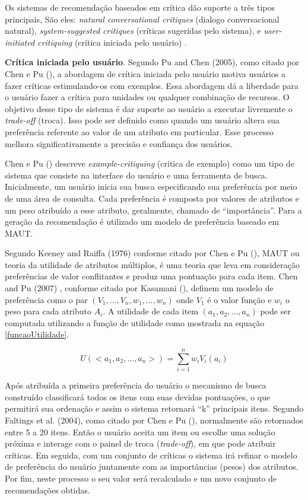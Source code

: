 Os sistemas de recomendação baseados em crítica dão suporte a três tipos principais, São eles: \textit{natural conversational critiques} (dialogo conversacional natural), \textit{system-suggested critiques} (críticas sugeridas pelo sistema), e \textit{user-initiated critiquing} (crítica iniciada pelo usuário) \cite{Chen:2012}.

\textbf{Crítica iniciada pelo usuário}. Segundo Pu and Chen (2005), como citado por Chen e Pu (\citeyear{Chen:2012}), a abordagem de crítica iniciada pelo usuário motiva usuários a fazer críticas estimulando-os com exemplos. Essa abordagem dá a liberdade para o usuário fazer a crítica para unidades ou qualquer combinação de recursos. O objetivo desse tipo de sistema é dar suporte ao usuário a executar livremente o \textit{trade-off} (troca). Isso pode ser definido como quando um usuário altera sua preferência referente ao valor de um atributo em particular. Esse processo melhora significativamente a precisão e confiança dos usuários.

Chen e Pu (\citeyear{Chen:2012}) descreve \textit{example-critiquing} (crítica de exemplo) como um tipo de sistema que consiste na interface do usuário e uma ferramenta de busca. Inicialmente, um usuário inicia sua busca especificando sua preferência por meio de uma área de consulta. Cada preferência é composta por valores de atributos e um peso atribuído a esse atributo, geralmente, chamado de “importância”. Para a geração da recomendação é utilizado um modelo de preferência baseado em MAUT.

Segundo Keeney and Raiffa (1976) conforme citado por Chen e Pu (\citeyear{Chen:2012}), MAUT ou teoria da utilidade de atributos múltiplos, é uma teoria que leva em consideração preferências de valor conflitantes e produz uma pontuação para cada item. Chen and Pu (2007) , conforme citado por Kasamani (\citeyear{Kasamani:2017}), definem um modelo de preferência como o par \((V_1, ..., V_n, w_1, ..., w_n)\) onde \(V_1\) é o valor função e \(w_i\) o peso para cada atributo \(A_i\). A utilidade de cada item \((a_1, a_2, ..., a_n)\) pode ser computada utilizando a função de utilidade como mostrada na equação \eqref{funcaoUtilidade}.

\begin{equation}
    \label{funcaoUtilidade}
    U(<a_1,a_2,...,a_n>)=\sum_{i=1}^{n} w_i V_i(a_i)
\end{equation}

Após atribuída a primeira preferência do usuário o mecanismo de busca construído classificará todos os itens com suas devidas pontuações, o que permitirá sua ordenação e assim o sistema retornará “k” principais itens. Segundo Faltings et al. (2004), como citado por Chen e Pu (\citeyear{Chen:2012}), normalmente são retornados entre 5 a 20 itens. Então o usuário aceita um item ou escolhe uma solução próxima e interage com o painel de troca (\textit{trade-off}), em que pode atribuir críticas. Em seguida, com um conjunto de críticas o sistema irá refinar o modelo de preferência do usuário juntamente com as importâncias (pesos) dos atributos. Por fim, neste processo o seu valor será recalculado e um novo conjunto de recomendações obtidas.

